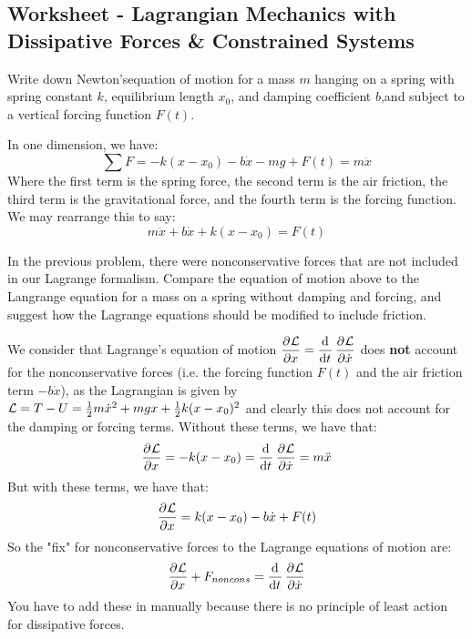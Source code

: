 \documentclass[../PHYS306Notes.tex]{subfiles}
\begin{document}
\subsection{Worksheet - Lagrangian Mechanics with Dissipative Forces \& Constrained Systems}
\begin{p}Write down Newton’sequation of motion for a mass $m$ hanging on a spring with spring constant $k$, equilibrium length $x_0$, and damping coefficient $b$,and subject to a vertical forcing function $F(t)$.
\end{p}
\begin{s}
In one dimension, we have:
\[\sum F = -k(x-x_0) - b\dot{x} - mg + F(t) = m\ddot{x}\]
Where the first term is the spring force, the second term is the air friction, the third term is the gravitational force, and the fourth term is the forcing function. We may rearrange this to say:
\[m\ddot{x} + b\dot{x} + k(x-x_0) = F(t)\]

\end{s}
\begin{p}
In the previous problem, there were nonconservative forces that are not included in our Lagrange formalism. Compare the equation of motion above to the Langrange equation for a mass on a spring without damping and forcing, and suggest how the Lagrange equations should be modified to include friction.
\end{p}
\begin{s}
We consider that Lagrange's equation of motion $\dpd{\LL}{x} = \dod{}{t}\dpd{\LL}{\dot{x}}$ does \textbf{not} account for the nonconservative forces (i.e. the forcing function $F(t)$ and the air friction term $-b\dot{x}$), as the Lagrangian is given by $\mathcal{L} = T - U = \frac{1}{2}m\dot{x}^2 + mgx + \frac{1}{2}k(x-x_0)^2$ and clearly this does not account for the damping or forcing terms. Without these terms, we have that:
\[\dpd{\LL}{x} = -k(x - x_0) = \dod{}{t}\dpd{\LL}{\dot{x}} = m\ddot{x}\]
But with these terms, we have that:
\[\dpd{\LL}{x} = k(x - x_0) - b\dot{x} + F(t)\]
So the "fix" for nonconservative forces to the Lagrange equations of motion are:
\[\dpd{\LL}{x} + F_{noncons} = \dod{}{t}\dpd{\LL}{\dot{x}}\]
You have to add these in manually because there is no principle of least action for dissipative forces.

\end{s}
\end{document}
